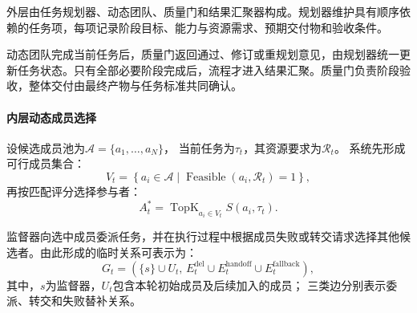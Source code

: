 

外层由任务规划器、动态团队、质量门和结果汇聚器构成。规划器维护具有顺序依赖的任务项，每项记录阶段目标、能力与资源需求、预期交付物和验收条件。

动态团队完成当前任务后，质量门返回通过、修订或重规划意见，由规划器统一更新任务状态。只有全部必要阶段完成后，流程才进入结果汇聚。质量门负责阶段验收，整体交付由最终产物与任务标准共同确认。

\paragraph{内层动态成员选择}

设候选成员池为$\mathcal{A}=\{a_1,\ldots,a_N\}$，
当前任务为$\tau_t$，其资源要求为$\mathcal{R}_t$。
系统先形成可行成员集合：
\begin{equation}
    V_t=
    \left\{
        a_i\in\mathcal{A}
        \mid
        \operatorname{Feasible}(a_i,\mathcal{R}_t)=1
    \right\},
\end{equation}
再按匹配评分选择参与者：
\begin{equation}
    A_t^*=
    \operatorname{TopK}_{a_i\in V_t}
    S(a_i,\tau_t).
\end{equation}

监督器向选中成员委派任务，并在执行过程中根据成员失败或转交请求选择其他候选者。由此形成的临时关系可表示为：
\begin{equation}
    G_t=
    \left(
        \{s\}\cup U_t,\,
        E_t^{\mathrm{del}}
        \cup E_t^{\mathrm{handoff}}
        \cup E_t^{\mathrm{fallback}}
    \right),
\end{equation}
其中，$s$为监督器，$U_t$包含本轮初始成员及后续加入的成员；
三类边分别表示委派、转交和失败替补关系。


